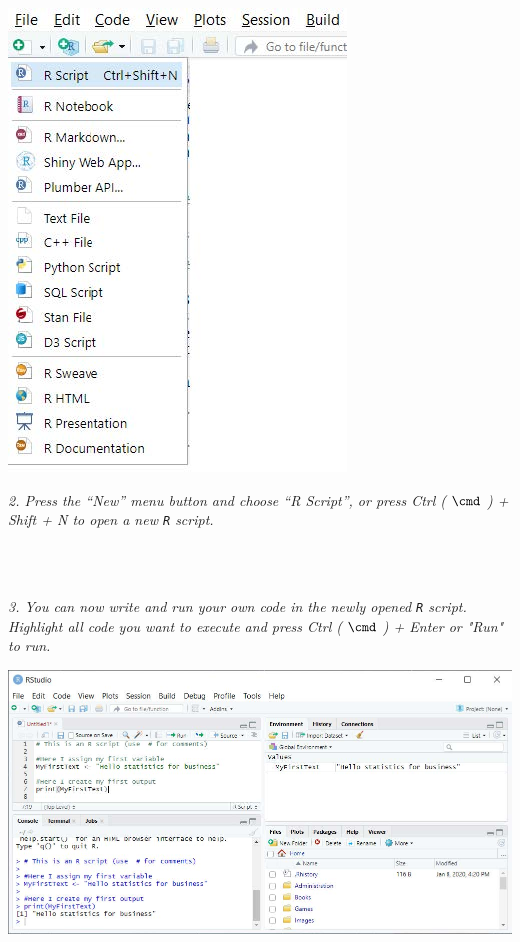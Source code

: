 \begin{minipage}{0.5\textwidth}
\includegraphics[width=.4\linewidth]{Files/Images/setup2.jpg}
\end{minipage}%
\hfill%
\begin{minipage}{0.4\textwidth}
\textit{2. Press the “New” menu button and choose
“R Script”, or press Ctrl ( $\cmd$ ) + Shift + N to
open a new \texttt{R} script.}
\end{minipage} \\
\\
\bigskip

\begin{minipage}{0.4\textwidth}
\textit{3. You can now write and run your
own code in the newly opened
\texttt{R} script. Highlight all code you
want to execute and press
Ctrl ( $\cmd$ ) + Enter or "Run" to run.}
\end{minipage}%
\hfill%
\begin{minipage}{0.55\textwidth}
\includegraphics[width=\linewidth]{Files/Images/setup3.jpg}
\end{minipage} \\
\\
\bigskip

\clearpage %

